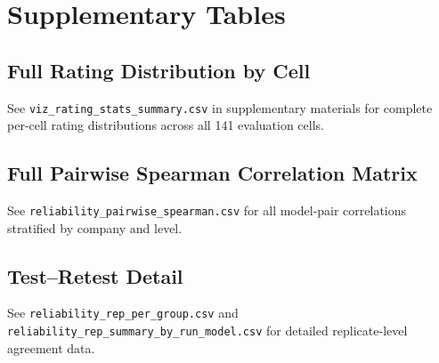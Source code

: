 \documentclass{article}
\begin{document}
\section{Supplementary Tables}

\subsection{Full Rating Distribution by Cell}
See \texttt{viz\_rating\_stats\_summary.csv} in supplementary materials for complete per-cell rating distributions across all 141 evaluation cells.

\subsection{Full Pairwise Spearman Correlation Matrix}
See \texttt{reliability\_pairwise\_spearman.csv} for all model-pair correlations stratified by company and level.

\subsection{Test--Retest Detail}
See \texttt{reliability\_rep\_per\_group.csv} and \texttt{reliability\_rep\_summary\_by\_run\_model.csv} for detailed replicate-level agreement data.
\end{document}
